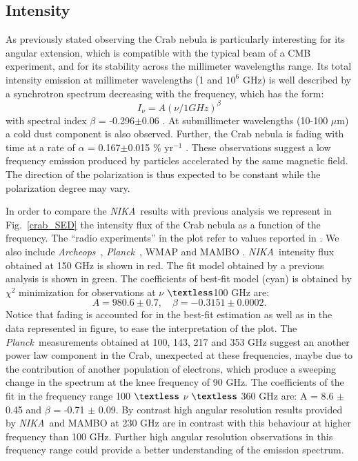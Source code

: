 \documentclass[twocolumn,traditabstract]{aa}
\def\NIKA{\textit{NIKA}}
\def\Archeops{\textit{Archeops}}
\def\Planck{\textit{Planck}}
\begin{document}
\subsection{Intensity}
As previously stated observing the Crab nebula is particularly interesting for its angular extension, which is compatible with the typical beam of a CMB experiment, and for its stability across the millimeter wavelengths range. 
Its total intensity emission at millimeter wavelengths (1 and $10^6$ GHz) is well described by a synchrotron spectrum decreasing with the frequency, which has the form:
\begin{equation}
I_{\nu} = A(\nu / 1 GHz)^{\beta}
\end{equation}\label{eq:sync}
 with spectral index $\beta$ = -0.296$\pm$0.06 \citep{baars1977absolute,macias2010}. At submillimeter wavelengths (10-100 $\mu$m) a cold dust component is also observed. Further, the Crab nebula is fading with time at a rate of $\alpha$ = 0.167$\pm$0.015 \% yr$^{-1}$ \citep{aller1985decrease}. 
These observations suggest a low frequency emission produced by particles accelerated by the same magnetic field. The direction of the polarization is thus expected to be constant while the polarization degree may vary. 

In order to compare the \NIKA\ results with previous analysis we represent in Fig.~\ref{crab_SED} the intensity flux of the Crab nebula as a function of the frequency. The ``radio experiments''  in the plot refer to values reported in \citep{dmitrenko1970absolute,1971IzVUZ..14..157V}. We also include \Archeops\ \citep{macias2007archeops}, \Planck\ \citep{2015arXiv150702058P}, WMAP \citep{2011ApJS..192...19W} and MAMBO \citep{2002A&A...386.1044B}. \NIKA\ intensity flux obtained at 150 GHz is shown in red.
The fit model obtained by a previous analysis \citep{macias2010} is shown in green. The coefficients of best-fit model (cyan) is obtained by $\chi^2$ minimization for observations at $\nu$ $\textless$100 GHz are:
\begin{equation}
 A = 980.6 \pm 0.7  ,\quad \beta = -0.3151 \pm 0.0002. 
 \end{equation}
 Notice that fading is accounted for in the best-fit estimation as well as in the data represented in figure, to ease the interpretation of the plot.
 The \Planck\ measurements obtained at 100, 143, 217 and 353 GHz suggest an another power law component in the Crab, unexpected at these frequencies, maybe due to the contribution of another population of electrons, which produce a sweeping change in the spectrum at the knee frequency of 90 GHz. The coefficients of the fit in the frequency range 100 $\textless$ $\nu$ $\textless$ 360 GHz are: A = 8.6 $\pm$ 0.45 and $\beta$ = -0.71 $\pm$ 0.09. By contrast high angular resolution results provided by \NIKA\ and MAMBO at 230 GHz are in contrast with this behaviour at higher frequency than 100 GHz. Further high angular resolution observations in this frequency range could provide a better understanding of the emission spectrum. 
\end{document}
